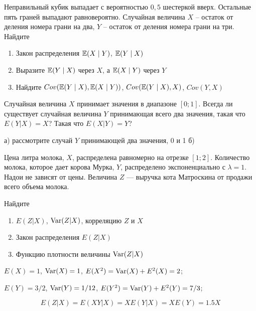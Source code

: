 \begin{solution}
\begin{solution}
\begin{solution}
\begin{solution}
\begin{solution}
\begin{solution}
\begin{solution}
\begin{problem}
Неправильный кубик выпадает с вероятностью $0{,}5$ шестеркой вверх. Остальные пять граней выпадают равновероятно. Случайная величина $X$ -- остаток от деления номера грани на два, $Y$ -- остаток от деления номера грани на три. Найдите
\begin{enumerate}
\item Закон распределения $\mathbb{E}(X\mid Y)$, $\mathbb{E}(Y\mid X)$
\item Выразите $\mathbb{E}(Y\mid X)$ через $X$, а $\mathbb{E}(X\mid Y)$ через $Y$
\item Найдите $Cov(\mathbb{E}(Y\mid X),\mathbb{E}(X\mid Y))$, $Cov(\mathbb{E}(Y\mid X),X)$, $Cov(Y,X)$
\end{enumerate}
\end{problem} 
\begin{solution} 

\end{solution}

\begin{problem}
Случайная величина $X$ принимает значения в диапазоне $[0;1]$. Всегда ли существует случайная величина $Y$ принимающая всего два значения, такая что $E(Y|X)=X$? Такая что $E(X|Y)=Y$? 
\end{problem} 
\begin{solution} 
а) рассмотрите случай $Y$ принимающей два значения, 0 и 1 б)
\end{solution}

\begin{problem}
Цена литра молока, $X$, распределена равномерно на отрезке $[1;2]$. Количество молока, которое дает корова Мурка, $Y$, распределено экспоненциально с $\lambda=1$. Надои не зависят от цены. Величина $Z$ --- выручка кота Матроскина от продажи всего объема молока.

Найдите
\begin{enumerate}
\item $E(Z|X)$, $\operatorname{Var}(Z|X)$, корреляцию $Z$ и $X$
\item Закон распределения $E(Z|X)$
\item Функцию плотности величины $\operatorname{Var}(Z|X)$
\end{enumerate}
\end{problem} 
\begin{solution} 
 $E(X)=1$, $\operatorname{Var}(X)=1$, $E(X^2)=\operatorname{Var}(X)+E^2(X)=2$; 

$E(Y)=3/2$, $\operatorname{Var}(Y)=1/12$, $E(Y^2)=\operatorname{Var}(Y)+E^2(Y)=7/3$;

\begin{equation}
E(Z|X)=E(XY|X)=XE(Y|X)=XE(Y)=1.5X
\end{equation}


\end{solution}
\end{solution}
\end{solution}
\end{solution}
\end{solution}
\end{solution}
\end{solution}
\end{solution}
